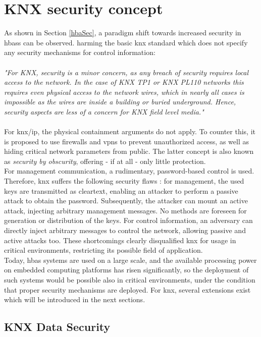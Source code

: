 \section{KNX security concept}
As shown in Section \ref{hbaSec}, a paradigm shift towards increased security in \glspl{hbas} can be observed. 
harming the basic \gls{knx} standard which does not specify any security mechanisms for control information:
\\
\\
\textit{"For KNX, security is a minor concern, as any breach of security requires local access to the network. 
In the case of KNX TP1 or KNX PL110 networks this requires even physical access to the network wires,
which in nearly all cases is impossible as the wires are inside a building or buried underground.
Hence, security aspects are less of a concern for KNX field level media."} \cite{knxSpec}
\\
\\
For \gls{knx}/\gls{ip}, the physical containment arguments do not apply. To counter this, it is proposed to use firewalls and \glspl{vpn} to prevent unauthorized access,
as well as hiding critical network parameters from public. The latter concept is also known as \textit{security by obscurity}, offering - if at all - only 
little protection.
\\
For management communication, a rudimentary, password-based control is used. Therefore, \gls{knx} suffers the following security flaws 
\cite{Granzer05securityin}: for management, the 
used keys are transmitted as cleartext, enabling an attacker to perform a passive attack to obtain the password. Subsequently, the attacker can mount an active
attack, injecting
arbitrary management messages. No methods are foreseen for generation or distribution of the keys.
For control information, an adversary can directly inject arbitrary messages to control the network, allowing passive and active attacks too.
These shortcomings clearly disqualified \gls{knx} for usage in critical environments, restricting its possible field of application.
\\
Today, \gls{hbas} systems are used on a large scale, and the available processing power on embedded computing platforms has risen significantly, so the deployment
of such systems would be possible also in critical environments, under the condition that proper security mechanisms are deployed. For \gls{knx}, several extensions
exist which will be introduced in the next sections.

\subsection{KNX Data Security}

